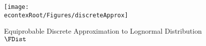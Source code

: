   \hypertarget{discreteApprox}{}
  \begin{figure}
    \texttt{[image: \\econtexRoot/Figures/discreteApprox]}
    \caption{Equiprobable Discrete Approximation to Lognormal Distribution $\FDist$}
    \label{fig:discreteapprox}
  \end{figure}
